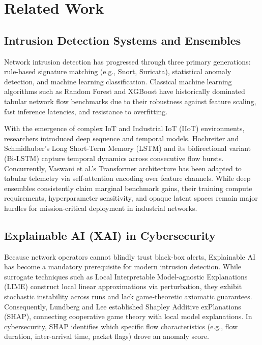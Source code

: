 \documentclass[conference]{IEEEtran}
\begin{document}
\section{Related Work}
\subsection{Intrusion Detection Systems and Ensembles}
Network intrusion detection has progressed through three primary generations: rule-based signature matching (e.g., Snort, Suricata), statistical anomaly detection, and machine learning classification. Classical machine learning algorithms such as Random Forest \cite{breiman2001random} and XGBoost \cite{chen2016xgboost} have historically dominated tabular network flow benchmarks due to their robustness against feature scaling, fast inference latencies, and resistance to overfitting. 

With the emergence of complex IoT and Industrial IoT (IIoT) environments, researchers introduced deep sequence and temporal models. Hochreiter and Schmidhuber's Long Short-Term Memory (LSTM) \cite{hochreiter1997long} and its bidirectional variant (Bi-LSTM) capture temporal dynamics across consecutive flow bursts. Concurrently, Vaswani et al.'s Transformer architecture \cite{vaswani2017attention} has been adapted to tabular telemetry via self-attention encoding over feature channels. While deep ensembles consistently claim marginal benchmark gains, their training compute requirements, hyperparameter sensitivity, and opaque latent spaces remain major hurdles for mission-critical deployment in industrial networks.

\subsection{Explainable AI (XAI) in Cybersecurity}
Because network operators cannot blindly trust black-box alerts, Explainable AI has become a mandatory prerequisite for modern intrusion detection. While surrogate techniques such as Local Interpretable Model-agnostic Explanations (LIME) \cite{ribeiro2016why} construct local linear approximations via perturbation, they exhibit stochastic instability across runs and lack game-theoretic axiomatic guarantees. Consequently, Lundberg and Lee \cite{lundberg2017unified} established Shapley Additive exPlanations (SHAP), connecting cooperative game theory with local model explanations. In cybersecurity, SHAP identifies which specific flow characteristics (e.g., flow duration, inter-arrival time, packet flags) drove an anomaly score. 
\end{document}
